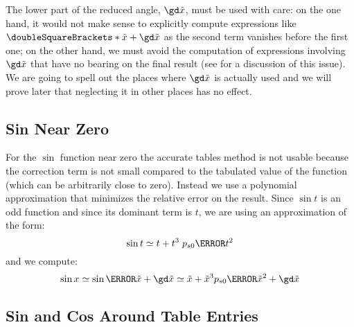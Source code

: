 \documentclass[10pt, a4paper, twoside]{basestyle}
\newcommand{\round}[1]{\doubleSquareBrackets*{#1}}
\newcommand{\red}[1]{\tilde{#1}}
\begin{document}
The lower part of the reduced angle, $\gd \red x$, must be used with care: on the one hand, it would not make sense to explicitly compute expressions like $\round{\red x + \gd \red x}$ as the second term vanishes before the first one; on the other hand, we must avoid the computation of expressions involving $\gd \red x$ that have no bearing on the final result (see \cite[402-404]{MullerBrisebarreDeDinechinJeannerodLefevreMelquiondRevolStehleTorres2010} for a discussion of this issue).  We are going to spell out the places where $\gd \red x$ is actually used and we will prove later that neglecting it in other places has no effect.

\subsection*{Sin Near Zero}

For the $\sin$ function near zero the accurate tables method is not usable because the correction term is not small compared to the tabulated value of the function (which can be arbitrarily close to zero).  Instead we use a polynomial approximation that minimizes the relative error on the result.  Since $\sin t$ is an odd function and since its dominant term is $t$, we are using an approximation of the form:
\[
\sin t \simeq t + t^3 \; p_{s0}\of{t^2}
\]
and we compute:
\[
\sin x \simeq \sin\of{\red x + \gd \red x} \simeq \red x + {\red x}^3 p_{s0}\of{{\red x}^2} + \gd \red x
\]

\subsection*{Sin and Cos Around Table Entries}
\end{document}
